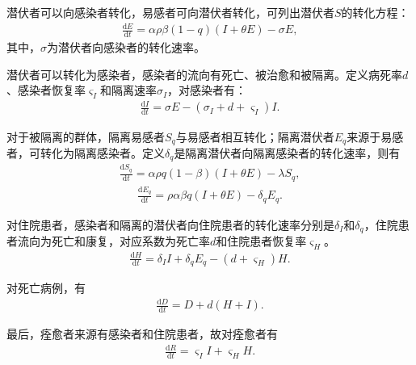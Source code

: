 \documentclass{whutmod}
\begin{document}
			潜伏者可以向感染者转化，易感者可向潜伏者转化，可列出潜伏者$S$的转化方程：
			\begin{gather}
			\frac{\mathrm{d} E}{\mathrm{d} t}=\alpha\rho\beta(1-q) (I+\theta E)-\sigma E,
			\end{gather}
			其中，$\sigma$为潜伏者向感染者的转化速率。
			
			潜伏者可以转化为感染者，感染者的流向有死亡、被治愈和被隔离。定义病死率$d$、感染者恢复率$\varsigma_I$和隔离速率$\sigma_I$，对感染者有：
			\begin{gather}
			\frac{\mathrm{d} I}{\mathrm{d} t}=\sigma E-(\sigma_I+d+\varsigma_I)I.
			\end{gather}
			
			对于被隔离的群体，隔离易感者$S_q$与易感者相互转化；隔离潜伏者$E_q$来源于易感者，可转化为隔离感染者。定义$\delta_q$是隔离潜伏者向隔离感染者的转化速率，则有
			\begin{gather}
			\frac{\mathrm{d} S_q}{\mathrm{d} t}=\alpha\rho q(1-\beta)(I+\theta E)-\lambda S_q,
			\end{gather}
			\begin{gather}
			\frac{\mathrm{d} E_q}{\mathrm{d} t}=\rho \alpha \beta q(I+\theta E)-\delta_q E_q.
			\end{gather}
			
			对住院患者，感染者和隔离的潜伏者向住院患者的转化速率分别是$\delta_I$和$\delta_q$，住院患者流向为死亡和康复，对应系数为死亡率$d$和住院患者恢复率$\varsigma_H$。
			\begin{gather}
			\frac{\mathrm{d}H }{\mathrm{d} t}=\delta_I I+ \delta_q E_q-(d+\varsigma_H )H.
			\end{gather}
			
			对死亡病例，有
			\begin{gather}
			\frac{\mathrm{d} D}{\mathrm{d} t}= D + d(H+I).
			\end{gather}
			
			最后，痊愈者来源有感染者和住院患者，故对痊愈者有
			\begin{gather}
			\frac{\mathrm{d} R}{\mathrm{d} t}=\varsigma_I I+\varsigma_H H.
			\end{gather}
			
\end{document}
